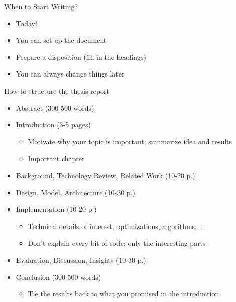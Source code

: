 \documentclass[hyperref={pdfpagelabels=false}, aspectratio=1610,handout]{beamer}
\begin{document}
\begin{frame}
\begin{block}{When to Start Writing?}
 \begin{itemize}
  \item<2-> Today!
  \item<2-> You can set up the document 
  \item<2-> Prepare a disposition (fill in the headings)
  \item<2-> You can always change things later
 \end{itemize}
\end{block}
\end{frame}

\begin{frame}
\begin{block}{How to structure the thesis report}
 \begin{itemize}
  \item Abstract (300-500 words)
  \item Introduction (3-5 pages)
  \begin{itemize}
  	\item Motivate why your topic is important; summarize idea and results
	\item Important chapter
  \end{itemize}
  \item Background, Technology Review, Related Work (10-20 p.)
  \item Design, Model, Architecture (10-30 p.)
  \item Implementation (10-20 p.)
  \begin{itemize}
   \item Technical details of interest, optimizations, algorithms, ...
   \item Don't explain every bit of code; only the interesting parts
  \end{itemize}
  \item Evaluation, Discussion, Insights (10-30 p.)
  \item Conclusion (300-500 words)
  \begin{itemize}
  	\item Tie the results back to what you promised in the introduction
  \end{itemize}
 \end{itemize}
\end{block}
\end{frame}
\end{document}
